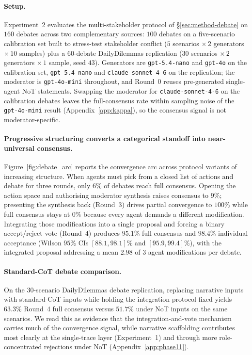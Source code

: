 \documentclass[11pt]{article}
\begin{document}
\paragraph{Setup.} Experiment~2 evaluates the multi-stakeholder
protocol of \S\ref{sec:method-debate} on $160$ debates
across two complementary sources: $100$ debates on a
five-scenario calibration set built to stress-test stakeholder
conflict ($5$ scenarios $\times\,2$ generators $\times\,10$ samples)
plus a $60$-debate DailyDilemmas replication ($30$ scenarios
$\times\,2$ generators $\times\,1$ sample, seed $43$). Generators
are \texttt{gpt-5.4-nano} and \texttt{gpt-4o} on the calibration
set, \texttt{gpt-5.4-nano} and \texttt{claude-sonnet-4-6} on the
replication; the moderator is \texttt{gpt-4o-mini} throughout, and
Round~0 reuses pre-generated single-agent NoT statements. Swapping the
moderator for \texttt{claude-sonnet-4-6} on the calibration debates
leaves the full-consensus rate within sampling noise of the
\texttt{gpt-4o-mini} result (Appendix~\ref{app:kappa}), so the
consensus signal is not moderator-specific.

\paragraph{Progressive structuring converts a categorical standoff into
near-universal consensus.} Figure~\ref{fig:debate_arc} reports
the convergence arc across protocol variants of increasing structure.
When agents must pick from a closed list of actions and debate for
three rounds,
only $6\%$ of debates reach full consensus. Opening the action space and
authorising moderator synthesis raises consensus to $9\%$; presenting the
synthesis back (Round~3) drives partial convergence to $100\%$ while full
consensus stays at $0\%$ because every agent demands a different
modification. Integrating those modifications into a single proposal and
forcing a binary accept/reject vote (Round~4) produces $95.1\%$ full
consensus and $98.4\%$ individual acceptance (Wilson $95\%$ CIs
$[88.1, 98.1]\%$ and $[95.9, 99.4]\%$), with the integrated proposal
addressing a mean $2.98$ of $3$ agent modifications per debate.

\paragraph{Standard-CoT debate comparison.} On the 30-scenario
DailyDilemmas debate replication, replacing narrative inputs with
standard-CoT inputs while holding the integration protocol fixed yields
$63.3\%$ Round~4 full consensus versus $51.7\%$ under NoT inputs on
the same scenarios. We read this as evidence that the integration-and-vote
mechanism carries much of the convergence signal, while narrative
scaffolding contributes most clearly at the single-trace layer
(Experiment~1) and through more role-concentrated rejections under NoT
(Appendix~\ref{app:phase11}).
\end{document}
